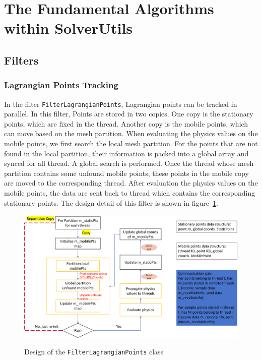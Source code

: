 %
\section{The Fundamental Algorithms within SolverUtils}
\subsection{Filters}
\subsubsection{Lagrangian Points Tracking}
In the filter \texttt{FilterLagrangianPoints}, Lagrangian points can be tracked in parallel. In this filter, Points are stored in two copies. One copy is the stationary points, which are fixed in the thread. Another copy is the mobile points, which can move based on the mesh partition. When evaluating the physics values on the mobile points, we first search the local mesh partition. For the points that are not found in the local partition, their information is packed into a global array and synced for all thread. A global search is performed. Once the thread whose mesh partition contains some unfound mobile points,  these points in the mobile copy are moved to the corresponding thread. After evaluation the physics values on the mobile points, the data are sent back to thread which contains the corresponding stationary points. The design detail of this filter is shown in figure~\ref{fig:LagrangianTrack}.
\begin{figure}[htp]
    \centering
    \includegraphics[width=\linewidth]{library/SolverUtils/img/LagrangianPtsTracking.png}
    \label{fig:LagrangianTrack}
    \caption{Design of the \texttt{FilterLagrangianPoints} class} 
\end{figure}